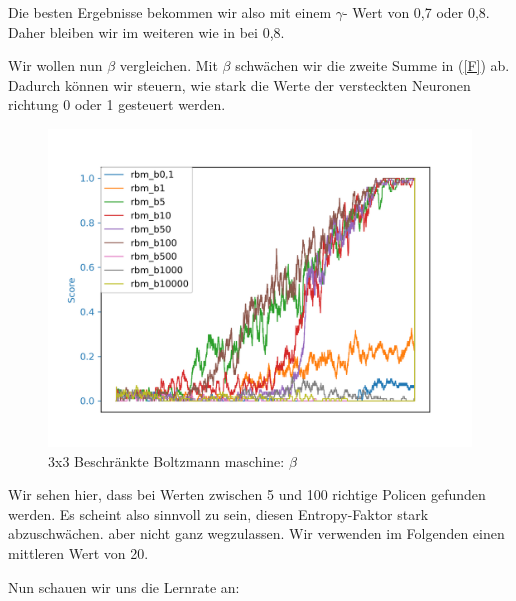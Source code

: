 Die besten Ergebnisse bekommen wir also mit einem $\gamma$- Wert von 0,7 oder 0,8. Daher bleiben wir im weiteren wie in \citep{crawford2019reinforcement} bei 0,8.

Wir wollen nun $\beta$ vergleichen. Mit $\beta$ schwächen wir die zweite Summe in (\ref{F}) ab. Dadurch können wir steuern, wie stark die Werte der versteckten Neuronen richtung 0 oder 1 gesteuert werden.

\begin{figure}[H]
\centering
\includegraphics[width=\textwidth]{Figures/rbm4_3x3_rbm_b0,1_rbm_b1_rbm_b5_rbm_b10_rbm_b50_rbm_b100_rbm_b500_rbm_b1000_rbm_b10000.png}
\caption{3x3 Beschränkte Boltzmann maschine: $\beta$}
\label{rbm3}
\end{figure}

Wir sehen hier, dass bei Werten zwischen 5 und 100 richtige Policen gefunden werden. Es scheint also sinnvoll zu sein, diesen Entropy-Faktor stark abzuschwächen. aber nicht ganz wegzulassen. Wir verwenden im Folgenden einen mittleren Wert von 20.

Nun schauen wir uns die Lernrate an:

